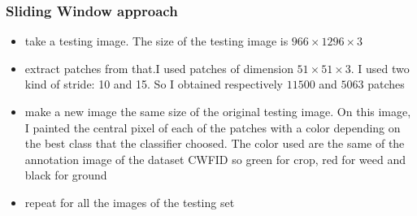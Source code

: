 \documentclass{beamer}
\begin{document}
\begin{frame}
\frametitle{Sliding Window approach}

\begin{itemize}

	\item take a testing image. The size of the testing image is $ 966\times 1296\times 3$
	\item extract patches from that.I used patches of dimension $ 51\times 51 \times 3 $. 				  I used two kind of stride: 10 and 15. So I obtained respectively $ 11500 $ and $ 		 		  5063 $ patches
	\item make a new image the same size of the original testing image. On this image, I 					  painted the central pixel of each of the patches with a color depending on the best  		  class that the classifier choosed. The color used are the same of the annotation 		          image of the dataset CWFID so green for crop, red for weed and black for ground
	\item repeat for all the images of the testing set

\end{itemize}

\end{frame}
\end{document}
